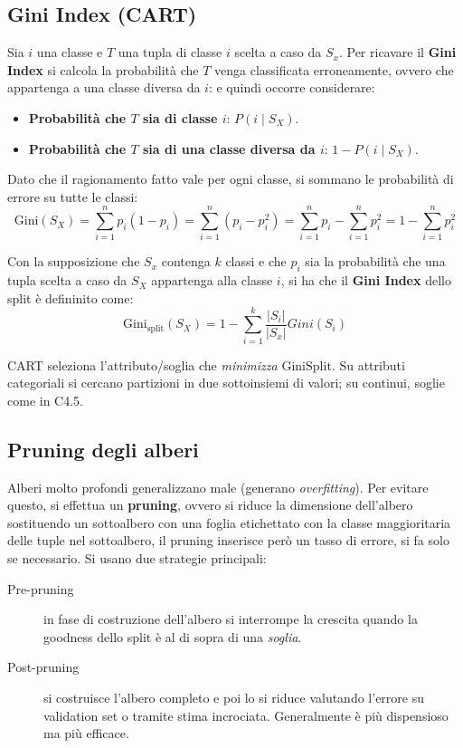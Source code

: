 
\subsection{Gini Index (CART)}\label{subsec:gini}
Sia $i$ una classe e $T$ una tupla di classe $i$ scelta a caso da $S_x$. Per ricavare il \textbf{Gini Index} si calcola la probabilità che $T$ venga classificata erroneamente, ovvero che appartenga a una classe diversa da $i$: e quindi occorre considerare:
\begin{itemize}
  \item \textbf{Probabilità che $T$ sia di classe $i$}: $P(i\mid S_X)$.
  \item \textbf{Probabilità che $T$ sia di una classe diversa da $i$}: $1 - P(i\mid S_X)$.
\end{itemize}

\noindent
Dato che il ragionamento fatto vale per ogni classe, si sommano le probabilità di errore su tutte le classi:  
\[
\mathrm{Gini}(S_X) = \sum_{i=1}^n p_i (1-p_i) = \sum_{i=1}^n (p_i-p_i^2) = \sum_{i=1}^n p_i - \sum_{i=1}^n p_i^2 = 1 - \sum_{i=1}^n p_i^2 
\]

Con la supposizione che $S_x$ contenga $k$ classi e che $p_i$ sia la probabilità che una tupla scelta a caso da $S_X$ appartenga alla classe $i$, si ha che il \textbf{Gini Index} dello split è defininito come:
\[
\mathrm{Gini_{split}}(S_X) = 1 - \sum_{i=1}^k \frac{|S_i|}{|S_x|}Gini(S_i) 
\]

CART seleziona l’attributo/soglia che \emph{minimizza} $\mathrm{GiniSplit}$. Su attributi categoriali si cercano partizioni in due sottoinsiemi di valori; su continui, soglie come in C4.5.


\subsection{Pruning degli alberi}\label{subsec:pruning}
Alberi molto profondi generalizzano male (generano \emph{overfitting}). Per evitare questo, si effettua un \textbf{pruning}, ovvero si riduce la dimensione dell'albero sostituendo un sottoalbero con una foglia etichettato con la classe maggioritaria delle tuple nel sottoalbero, il pruning inserisce però un tasso di errore, si fa solo se necessario. Si usano due strategie principali:
\begin{description}
  \item[Pre-pruning] in fase di costruzione dell'albero si interrompe la crescita quando la goodness dello split è al di sopra di una \emph{soglia}.
  \item[Post-pruning] si costruisce l'albero completo e poi lo si riduce valutando l'errore su validation set o tramite stima incrociata. Generalmente è più dispensioso ma più efficace.
\end{description}

